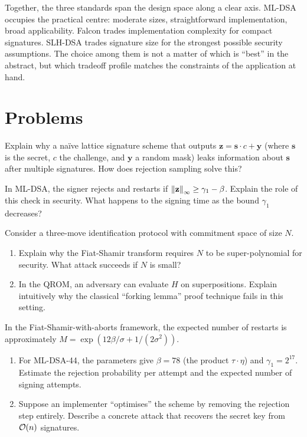 Together, the three standards span the design space along a clear axis.  ML-DSA occupies the practical centre: moderate sizes, straightforward implementation, broad applicability.  Falcon trades implementation complexity for compact signatures.  SLH-DSA trades signature size for the strongest possible security assumptions.  The choice among them is not a matter of which is ``best'' in the abstract, but which tradeoff profile matches the constraints of the application at hand.


\section*{Problems}

\begin{prob}
\label{prob:ch08-leakage}
Explain why a na\"ive lattice signature scheme that outputs $\mathbf{z} = \mathbf{s} \cdot c + \mathbf{y}$ (where $\mathbf{s}$ is the secret, $c$ the challenge, and $\mathbf{y}$ a random mask) leaks information about $\mathbf{s}$ after multiple signatures.  How does rejection sampling solve this?
\end{prob}

\begin{prob}
\label{prob:ch08-dilithium}
In ML-DSA, the signer rejects and restarts if $\left\lVert \mathbf{z} \right\rVert_\infty \geq \gamma_1 - \beta$.  Explain the role of this check in security.  What happens to the signing time as the bound $\gamma_1$ decreases?
\end{prob}

\begin{prob}
\label{prob:ch08-fs-transform}
Consider a three-move identification protocol with commitment space of size $N$.
\begin{enumerate}
\item[(a)] Explain why the Fiat-Shamir transform requires $N$ to be super-polynomial for security.  What attack succeeds if $N$ is small?
\item[(b)] In the QROM, an adversary can evaluate $H$ on superpositions.  Explain intuitively why the classical ``forking lemma'' proof technique fails in this setting.
\end{enumerate}
\end{prob}

\begin{prob}
\label{prob:ch08-rejection-rate}
In the Fiat-Shamir-with-aborts framework, the expected number of restarts is approximately $M = \exp(12\beta/\sigma + 1/(2\sigma^2))$.
\begin{enumerate}
\item[(a)] For ML-DSA-44, the parameters give $\beta = 78$ (the product $\tau \cdot \eta$) and $\gamma_1 = 2^{17}$.  Estimate the rejection probability per attempt and the expected number of signing attempts.
\item[(b)] Suppose an implementer ``optimises'' the scheme by removing the rejection step entirely.  Describe a concrete attack that recovers the secret key from $\mathcal{O}(n)$ signatures.
\end{enumerate}
\end{prob}

